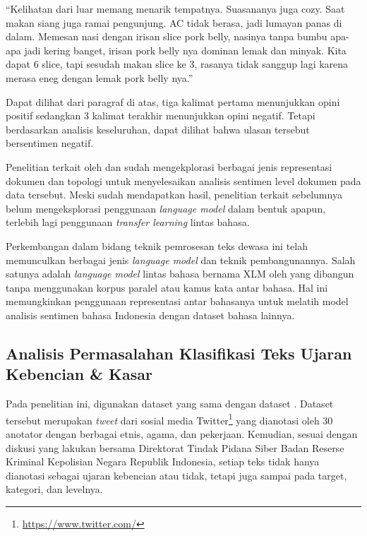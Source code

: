 	“Kelihatan dari luar memang menarik tempatnya. Suasananya juga cozy. Saat makan siang juga ramai pengunjung. AC tidak berasa, jadi lumayan panas di dalam. Memesan nasi dengan irisan slice pork belly, nasinya tanpa bumbu apa- apa jadi kering banget, irisan pork belly nya dominan lemak dan minyak. Kita dapat 6 slice, tapi sesudah makan slice ke 3, rasanya tidak sanggup lagi karena merasa eneg dengan lemak pork belly nya.”

	Dapat dilihat dari paragraf di atas, tiga kalimat pertama menunjukkan opini positif sedangkan 3 kalimat terakhir menunjukkan opini negatif. Tetapi berdasarkan analisis keseluruhan, dapat dilihat bahwa ulasan tersebut bersentimen negatif.

	Penelitian terkait oleh \parencite{FarhanKhodra2017} dan \parencite{CrisdayantiPurwarianti2019} sudah mengekplorasi berbagai jenis representasi dokumen dan topologi untuk menyelesaikan analisis sentimen level dokumen pada data tersebut. Meski sudah mendapatkan hasil, penelitian terkait sebelumnya belum mengeksplorasi penggunaan \textit{language model} dalam bentuk apapun, terlebih lagi penggunaan \textit{transfer learning} lintas bahasa.

	Perkembangan dalam bidang teknik pemrosesan teks dewasa ini telah memunculkan berbagai jenis \textit{language model} dan teknik pembangunannya. Salah satunya adalah \textit{language model} lintas bahasa bernama XLM oleh \parencite{LampleConneau2019} yang dibangun tanpa menggunakan korpus paralel atau kamus kata antar bahasa. Hal ini memungkinkan penggunaan representasi antar bahasanya untuk melatih model analisis sentimen bahasa Indonesia dengan dataset bahasa lainnya.

	\subsection{Analisis Permasalahan Klasifikasi Teks Ujaran Kebencian \& Kasar}

	Pada penelitian ini, digunakan dataset yang sama dengan dataset \parencite{Ibrohim_Budi_2019}. Dataset tersebut merupakan \textit{tweet} dari sosial media Twitter\footnote{\url{https://www.twitter.com/}} yang dianotasi oleh 30 anotator dengan berbagai etnis, agama, dan pekerjaan. Kemudian, sesuai dengan diskusi yang \parencite{Diksusi_Bareskrim} lakukan bersama Direktorat Tindak Pidana Siber Badan Reserse Kriminal Kepolisian Negara Republik Indonesia, setiap teks tidak hanya dianotasi sebagai ujaran kebencian atau tidak, tetapi juga sampai pada target, kategori, dan levelnya. 

